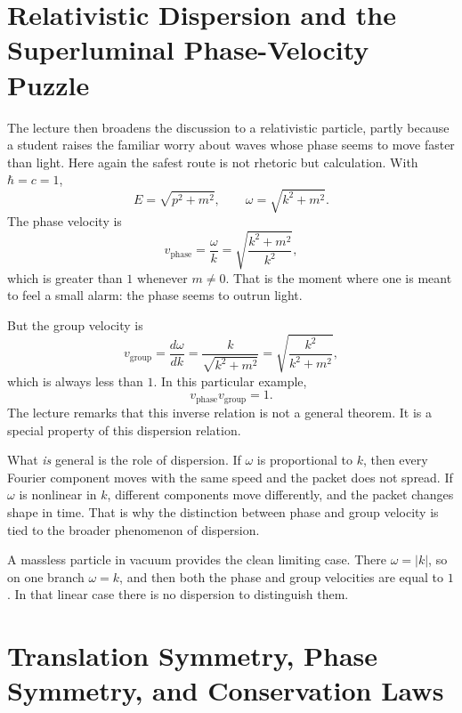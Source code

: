 \section{Relativistic Dispersion and the Superluminal Phase-Velocity Puzzle}

The lecture then broadens the discussion to a relativistic particle, partly because a student raises the familiar worry about waves whose phase seems to move faster than light. Here again the safest route is not rhetoric but calculation. With \(\hbar=c=1\),
\begin{equation}
E=\sqrt{p^2+m^2},
\qquad
\omega=\sqrt{k^2+m^2}.
\end{equation}
The phase velocity is
\begin{equation}
v_{\mathrm{phase}}=\frac{\omega}{k}
=
\sqrt{\frac{k^2+m^2}{k^2}},
\end{equation}
which is greater than \(1\) whenever \(m\neq 0\). That is the moment where one is meant to feel a small alarm: the phase seems to outrun light.

But the group velocity is
\begin{equation}
v_{\mathrm{group}}=\frac{d\omega}{dk}
=
\frac{k}{\sqrt{k^2+m^2}}
=
\sqrt{\frac{k^2}{k^2+m^2}},
\end{equation}
which is always less than \(1\). In this particular example,
\begin{equation}
v_{\mathrm{phase}}v_{\mathrm{group}}=1.
\end{equation}
The lecture remarks that this inverse relation is not a general theorem. It is a special property of this dispersion relation.

What \emph{is} general is the role of dispersion. If \(\omega\) is proportional to \(k\), then every Fourier component moves with the same speed and the packet does not spread. If \(\omega\) is nonlinear in \(k\), different components move differently, and the packet changes shape in time. That is why the distinction between phase and group velocity is tied to the broader phenomenon of dispersion.

A massless particle in vacuum provides the clean limiting case. There \(\omega=|k|\), so on one branch \(\omega=k\), and then both the phase and group velocities are equal to \(1\). In that linear case there is no dispersion to distinguish them.

\section{Translation Symmetry, Phase Symmetry, and Conservation Laws}

